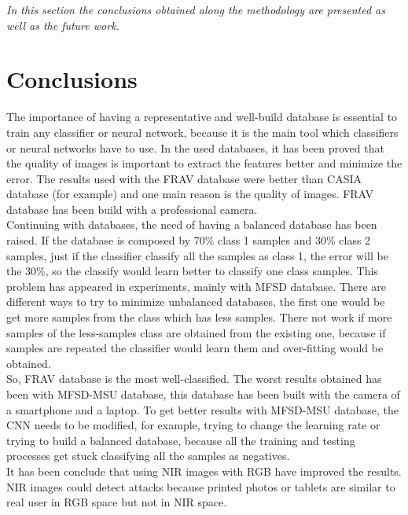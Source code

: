 \minitoc
\mtcskip

\begin{small}
\emph{In this section the conclusions obtained along the methodology are presented as well as the future work.\\}
\end{small}

\section{Conclusions}
The importance of having a representative and well-build database is essential to train any classifier or neural network, because it is the main tool which classifiers or neural networks have to use. In the used databases, it has been proved that the quality of images is important to extract the features better and minimize the error. The results used with the FRAV database were better than CASIA database (for example) and one main reason is the quality of images. FRAV database has been build with a professional camera.\\

Continuing with databases, the need of having a balanced database has been raised. If the database is composed by 70\% class 1 samples and 30\% class 2 samples, just if the classifier classify all the samples as class 1, the error will be the 30\%, so the classify would learn better to classify one class samples. This problem has appeared in experiments, mainly with MFSD database. There are different ways to try to minimize unbalanced databases, the first one would be get more samples from the class which has less samples. There not work if more samples of the less-samples class are obtained from the existing one, because if samples are repeated the classifier would learn them and over-fitting would be obtained.\\

So, FRAV database is the most well-classified. The worst results obtained has been with MFSD-MSU database, this database has been built with the camera of a smartphone and a laptop. To get better results with MFSD-MSU database, the CNN needs to be modified, for example, trying to change the learning rate or trying to build a balanced database, because all the training and testing processes get stuck classifying all the samples as negatives.\\

It has been conclude that using NIR images with RGB have improved the results. NIR images could detect attacks because printed photos or tablets are similar to real user in RGB space but not in NIR space.\\

